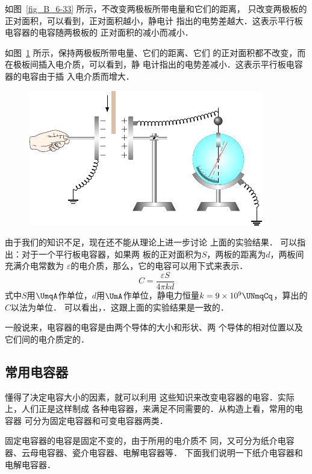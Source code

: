     如图~\ref{fig_B_6-33} 所示，不改变两极板所带电量和它们的距离，
    只改变两极板的正对面积，可以看到，正对面积越小，静电计
    指出的电势差越大．这表示平行板电容器的电容随两极板的
    正对面积的减小而减小．
   

    如图~\ref{fig_B_6-34} 所示，保持两极板所带电量、它们的距离、它们
    的正对面积都不改变，而在极板间插入电介质，可以看到，静
    电计指出的电势差减小．这表示平行板电容器的电容由于插
    入电介质而增大．
	
	 \begin{figure}[htbp]
		\centering
		\includegraphics{fig/B/6-34.pdf}
		\caption{}\label{fig_B_6-34}
	\end{figure}



    由于我们的知识不足，现在还不能从理论上进一步讨论
    上面的实验结果．
    可以指出：对于一个平行板电容器，如果两
    板的正对面积为$S$，两板的距离为$d$，两板间充满介电常数为
    $\varepsilon$的电介质，那么，它的电容可以用下式来表示．
\[C=\frac{\varepsilon S}{4\pi kd} \]
式中$S$用$\UmqA$作单位，$d$用$\UmA$作单位，静电力恒量$k=9\times 10^9 \UNmqCq$，算出的$C$以法为单位．
可以看出，．这跟上面的实验结果是一致的．

一般说来，电容器的电容是由两个导体的大小和形状、两
个导体的相对位置以及它们间的电介质定的．

\subsection{常用电容器}

懂得了决定电容大小的因素，就可以利用
这些知识来改变电容器的电容．实际上，人们正是这样制成
各种电容器，来满足不同需要的．从构造上看，常用的电容器
可分为固定电容器和可变电容器两类．

固定电容器的电容是固定不变的，由于所用的电介质不
同，又可分为纸介电容器、云母电容器、瓷介电容器、电解电容器等．
下面我们说明一下纸介电容器和电解电容器．

